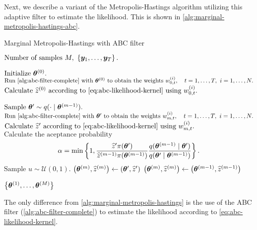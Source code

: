 Next, we describe a variant of the Metropolis-Hastings algorithm utilizing this adaptive filter to estimate the likelihood. This is shown in \autoref{alg:marginal-metropolis-hastings-abc}.
\begin{algorithm}[ht]
    \caption{Marginal Metropolis-Hastings with ABC filter}
    \label{alg:marginal-metropolis-hastings-abc}
    \begin{algorithmic}[1]
        \Input $\text{Number of samples } M,\ \left\{\by_1, \ldots, \by_T\right\}.$
        
        \State $\text{Initialize } \bm{\theta}^{(0)}.$
        \State $\text{Run \autoref{alg:abc-filter-complete} with } \btheta^{(0)} \text{ to obtain the weights } w_{0,t}^{(i)}, \quad t = 1, \ldots, T,\ i = 1, \ldots, N.$
        \State $\text{Calculate } \widehat{z}^{(0)} \text{ according to \eqref{eq:abc-likelihood-kernel} using } w_{0,t}^{(i)}.$
        
        \State $\text{Sample } \bm{\theta}^\prime \sim q(\cdot \mid \bm{\theta}^{(m-1)}).$
        \State $\text{Run \autoref{alg:abc-filter-complete} with } \btheta^\prime \text{ to obtain the weights } w_{m,t}^{(i)}, \quad t = 1, \ldots, T, \ i = 1, \ldots, N.$
        \State $\text{Calculate } \widehat{z}^\prime \text{ according to \eqref{eq:abc-likelihood-kernel} using } w_{m,t}^{(i)}.$
        \State $\text{Calculate the aceptance probability } $ \begin{equation*} \label{eq:acceptance-probability-tractable-abc}
        \alpha = \min \left\{1, \frac{\widehat{z}^\prime \pi(\bm{\theta}^\prime)}{\widehat{z}^{(m-1)} \pi(\bm{\theta}^{(m-1)})} \frac{q(\bm{\theta}^{(m-1)} \mid \bm{\theta}^\prime)}{q(\bm{\theta}^\prime \mid \bm{\theta}^{(m-1)})} \right\}.
        \end{equation*}
        \State $\text{Sample } u \sim \mathcal{U}(0,1).$
        \State $\left( \bm{\theta}^{(m)}, \widehat{z}^{(m)} \right) \gets \left( \bm{\theta}^\prime, \widehat{z}^\prime \right)$ 
        \Else
        \State $\left( \bm{\theta}^{(m)}, \widehat{z}^{(m)} \right) \gets \left( \bm{\theta}^{(m-1)}, \widehat{z}^{(m-1)} \right)$ 
        \EndIf
        \EndFor
        
        \Output $\left\{ \bm{\theta}^{(1)}, \ldots, \bm{\theta}^{(M)} \right\}$
    \end{algorithmic}
\end{algorithm}
The only difference from \autoref{alg:marginal-metropolis-hastings} is the use of the ABC filter (\autoref{alg:abc-filter-complete}) to estimate the likelihood according to \eqref{eq:abc-likelihood-kernel}.